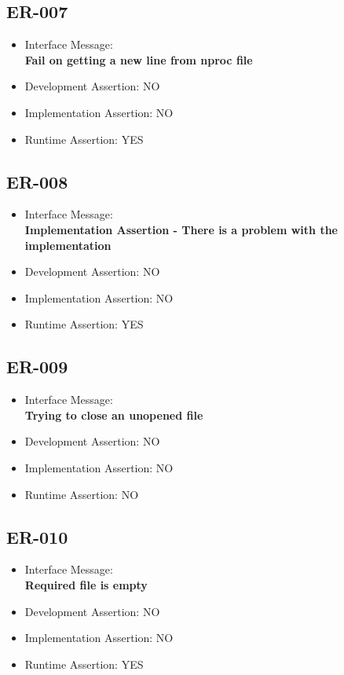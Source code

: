 \subsection{ER-007}
\begin{itemize}
  \item Interface Message:\\[1em]\textbf{Fail on getting a new line from nproc file}
  \item Development Assertion: NO
  \item Implementation Assertion: NO
  \item Runtime Assertion: YES
\end{itemize}

\subsection{ER-008}
\begin{itemize}
  \item Interface Message:\\[1em]\textbf{Implementation Assertion - There is a problem with the implementation}
  \item Development Assertion: NO
  \item Implementation Assertion: NO
  \item Runtime Assertion: YES
\end{itemize}

\subsection{ER-009}
\begin{itemize}
  \item Interface Message:\\[1em]\textbf{Trying to close an unopened file}
  \item Development Assertion: NO
  \item Implementation Assertion: NO
  \item Runtime Assertion: NO
\end{itemize}

\subsection{ER-010}
\begin{itemize}
  \item Interface Message:\\[1em]\textbf{Required file is empty}
  \item Development Assertion: NO
  \item Implementation Assertion: NO
  \item Runtime Assertion: YES
\end{itemize}

